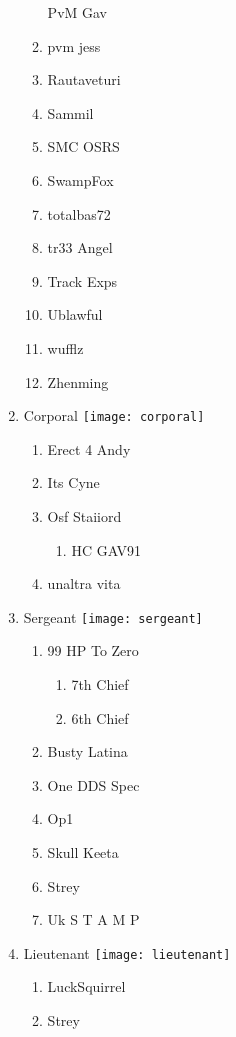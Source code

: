 \documentclass{article}
\begin{document}
\begin{enumerate}[I]
\begin{enumerate}[I]
	PvM Gav
      \item
	pvm jess
      \item
	Rautaveturi
      \item
	Sammil
      \item
	SMC OSRS
      \item
	SwampFox
      \item
	totalbas72
      \item
	tr33 Angel
      \item
	Track Exps
      \item
	Ublawful
      \item
	wufflz
      \item
	Zhenming
    \end{enumerate}
  \item
    Corporal \texttt{[image: corporal]}
    \begin{enumerate}[I]
      \item
	Erect 4 Andy
      \item
	Its Cyne
      \item
	Osf Staiiord
	\begin{enumerate}[I]
	  \item
	    HC GAV91
	\end{enumerate}
      \item
	unaltra vita
    \end{enumerate}
  \item
    Sergeant \texttt{[image: sergeant]}
    \begin{enumerate}[I]
      \item 
	99 HP To Zero
	\begin{enumerate}[I]
	  \item
	    7th Chief
	  \item
	    6th Chief
	\end{enumerate}
      \item
	Busty Latina
      \item
	One DDS Spec
      \item
	Op1
      \item
	Skull Keeta
      \item
	Strey
      \item
	Uk S T A M P
    \end{enumerate}
  \item
    Lieutenant \texttt{[image: lieutenant]}
    \begin{enumerate}[I]
      \item
	LuckSquirrel
      \item
	Strey

\end{enumerate}
\end{enumerate}
\end{document}
